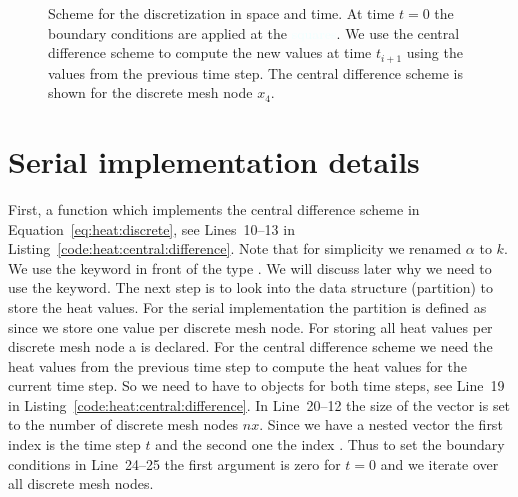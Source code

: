 \begin{figure}[tb]
\center
{}
\caption{Scheme for the discretization in space and time. At time $t=0$ the boundary conditions are applied at the \textcolor{azure}{squares}. We use the central difference scheme to compute the new values at time $t_{i+1}$ using the values from the previous time step. The central difference scheme is shown for the discrete mesh node $x_4$.}
\label{fig:heat:time:space}
\end{figure}

\section{Serial implementation details}
First, a function  which implements the central difference scheme in Equation~\ref{eq:heat:discrete}, see Lines~10--13 in Listing~\ref{code:heat:central:difference}. Note that for simplicity we renamed $\alpha$ to $k$. We use the keyword  in front of the  type . We will discuss later why we need to use the  keyword. The next step is to look into the data structure (partition) to store the heat values. For the serial implementation the partition is defined as  since we store one  value per discrete mesh node. For storing all heat values per discrete mesh node a  is declared. For the central difference scheme we need the heat values from the previous time step to compute the heat values for the current time step. So we need to have to  objects for both time steps, see Line~19 in Listing~\ref{code:heat:central:difference}. In Line~20--12 the size of the vector is set to the number of discrete mesh nodes $nx$. Since we have a nested vector  the first index is the time step $t$ and the second one the index . Thus to set the boundary conditions in Line~24--25 the first argument is zero for $t=0$ and we iterate over all discrete mesh nodes. \\

